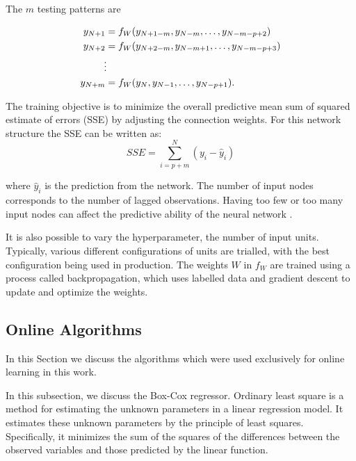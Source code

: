 \documentclass[final,3p,times,twocolumn,numbers]{elsarticle}
\begin{document}
The $m$ testing patterns are 

\begin{align}
y_{N+1} & =f_{W}(y_{N+1-m}, y_{N-m},\ldots,y_{N-m-p+2})\\
y_{N+2} & =f_{W}(y_{N+2-m}, y_{N-m+1},\ldots,y_{N-m-p+3})\\
&\vdotswithin  \notag \\
y_{N+m} & =f_{W}(y_{N},y_{N-1},\ldots,y_{N-p+1}).
\end{align}

The training objective is to minimize the overall predictive mean sum of squared estimate of errors (SSE) by adjusting the connection weights. For this network structure the SSE can be written as:
\begin{equation}
SSE = \sum_{i=p+m}^N(y_i-\hat{y}_i)
\end{equation}

\noindent where $\hat{y}_i$ is the prediction from the network. The number of input nodes corresponds to the number of lagged observations. Having too few or too many input nodes can affect the predictive ability of the neural network \cite{Pao2007}.

It is also possible to vary the hyperparameter, the number of input units. Typically, various different configurations of units are trialled, with the best configuration being used in production. The weights $W$ in $f_W$ are trained using a process called backpropagation, which uses labelled data and gradient descent to update and optimize the weights.

\subsection{Online Algorithms}


In this Section we discuss the algorithms which were used exclusively for online learning in this work.


In this subsection, we discuss the Box-Cox regressor. Ordinary least square is a method for estimating the unknown parameters in a linear regression model. It estimates these unknown parameters by the principle of least squares. Specifically, it minimizes the sum of the squares of the differences between the observed variables and those predicted by the linear function.
\end{document}

